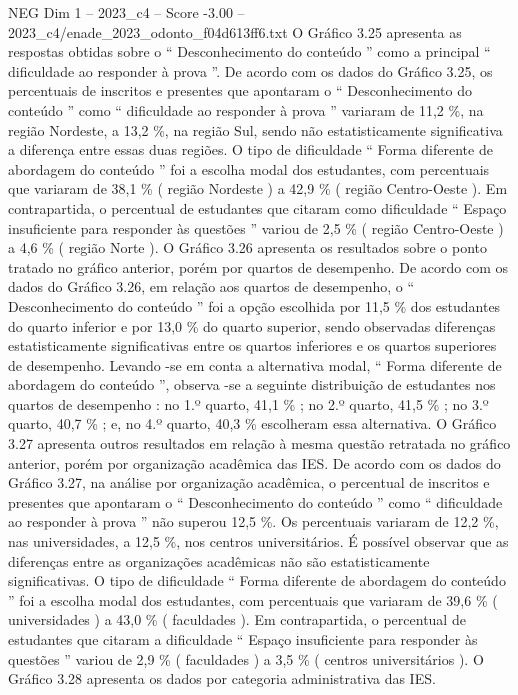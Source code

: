 \begin{textsample}{NEG Dim 1 – 2023\_c4 – Score -3.00 – 2023\_c4/enade\_2023\_odonto\_f04d613ff6.txt}
O Gráfico 3.25 apresenta as respostas obtidas sobre o “ Desconhecimento do conteúdo ” como a principal “ dificuldade ao responder à prova ”.
De acordo com os dados do Gráfico 3.25, os percentuais de inscritos e presentes que apontaram o “ Desconhecimento do conteúdo ” como “ dificuldade ao responder à prova ” variaram de 11,2 \%, na região Nordeste, a 13,2 \%, na região Sul, sendo não estatisticamente significativa a diferença entre essas duas regiões.
O tipo de dificuldade “ Forma diferente de abordagem do conteúdo ” foi a escolha modal dos estudantes, com percentuais que variaram de 38,1 \% ( região Nordeste ) a 42,9 \% ( região Centro-Oeste ).
Em contrapartida, o percentual de estudantes que citaram como dificuldade “ Espaço insuficiente para responder às questões ” variou de 2,5 \% ( região Centro-Oeste ) a 4,6 \% ( região Norte ).
O Gráfico 3.26 apresenta os resultados sobre o ponto tratado no gráfico anterior, porém por quartos de desempenho.
De acordo com os dados do Gráfico 3.26, em relação aos quartos de desempenho, o “ Desconhecimento do conteúdo ” foi a opção escolhida por 11,5 \% dos estudantes do quarto inferior e por 13,0 \% do quarto superior, sendo observadas diferenças estatisticamente significativas entre os quartos inferiores e os quartos superiores de desempenho.
Levando -se em conta a alternativa modal, “ Forma diferente de abordagem do conteúdo ”, observa -se a seguinte distribuição de estudantes nos quartos de desempenho : no 1.º quarto, 41,1 \% ; no 2.º quarto, 41,5 \% ; no 3.º quarto, 40,7 \% ; e, no 4.º quarto, 40,3 \% escolheram essa alternativa.
O Gráfico 3.27 apresenta outros resultados em relação à mesma questão retratada no gráfico anterior, porém por organização acadêmica das IES.
De acordo com os dados do Gráfico 3.27, na análise por organização acadêmica, o percentual de inscritos e presentes que apontaram o “ Desconhecimento do conteúdo ” como “ dificuldade ao responder à prova ” não superou 12,5 \%.
Os percentuais variaram de 12,2 \%, nas universidades, a 12,5 \%, nos centros universitários.
É possível observar que as diferenças entre as organizações acadêmicas não são estatisticamente significativas.
O tipo de dificuldade “ Forma diferente de abordagem do conteúdo ” foi a escolha modal dos estudantes, com percentuais que variaram de 39,6 \% ( universidades ) a 43,0 \% ( faculdades ).
Em contrapartida, o percentual de estudantes que citaram a dificuldade “ Espaço insuficiente para responder às questões ” variou de 2,9 \% ( faculdades ) a 3,5 \% ( centros universitários ).
O Gráfico 3.28 apresenta os dados por categoria administrativa das IES.

\end{textsample}
